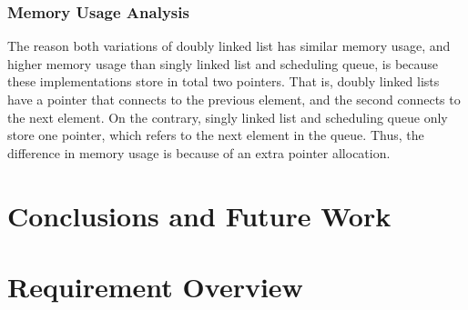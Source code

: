 \documentclass[a4paper,11pt]{kth-mag}
\begin{document}
\subsection{Memory Usage Analysis}
The reason both variations of doubly linked list has similar memory usage, and higher memory usage than singly linked list and scheduling queue, is because these implementations store in total two pointers.
That is, doubly linked lists have a pointer that connects to the previous element, and the second connects to the next element.
On the contrary, singly linked list and scheduling queue only store one pointer, which refers to the next element in the queue.
Thus, the difference in memory usage is because of an extra pointer allocation.



\chapter{Conclusions and Future Work}

%
\appendix
\addappheadtotoc

\chapter{Requirement Overview}\label{app:A}
\end{document}
